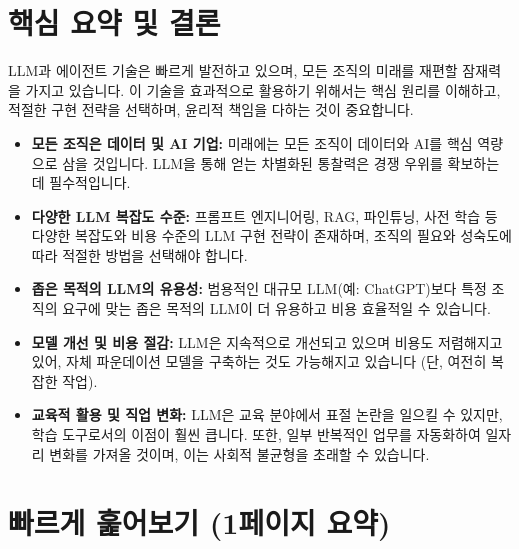 \documentclass[11pt,a4paper]{article}
\begin{document}
\newpage
\section{핵심 요약 및 결론}

LLM과 에이전트 기술은 빠르게 발전하고 있으며, 모든 조직의 미래를 재편할 잠재력을 가지고 있습니다. 이 기술을 효과적으로 활용하기 위해서는 핵심 원리를 이해하고, 적절한 구현 전략을 선택하며, 윤리적 책임을 다하는 것이 중요합니다.

\begin{itemize}
    \item \textbf{모든 조직은 데이터 및 AI 기업:} 미래에는 모든 조직이 데이터와 AI를 핵심 역량으로 삼을 것입니다. LLM을 통해 얻는 차별화된 통찰력은 경쟁 우위를 확보하는 데 필수적입니다.
    \item \textbf{다양한 LLM 복잡도 수준:} 프롬프트 엔지니어링, RAG, 파인튜닝, 사전 학습 등 다양한 복잡도와 비용 수준의 LLM 구현 전략이 존재하며, 조직의 필요와 성숙도에 따라 적절한 방법을 선택해야 합니다.
    \item \textbf{좁은 목적의 LLM의 유용성:} 범용적인 대규모 LLM(예: ChatGPT)보다 특정 조직의 요구에 맞는 좁은 목적의 LLM이 더 유용하고 비용 효율적일 수 있습니다.
    \item \textbf{모델 개선 및 비용 절감:} LLM은 지속적으로 개선되고 있으며 비용도 저렴해지고 있어, 자체 파운데이션 모델을 구축하는 것도 가능해지고 있습니다 (단, 여전히 복잡한 작업).
    \item \textbf{교육적 활용 및 직업 변화:} LLM은 교육 분야에서 표절 논란을 일으킬 수 있지만, 학습 도구로서의 이점이 훨씬 큽니다. 또한, 일부 반복적인 업무를 자동화하여 일자리 변화를 가져올 것이며, 이는 사회적 불균형을 초래할 수 있습니다.
\end{itemize}

\newpage
\section{빠르게 훑어보기 (1페이지 요약)}
\end{document}
